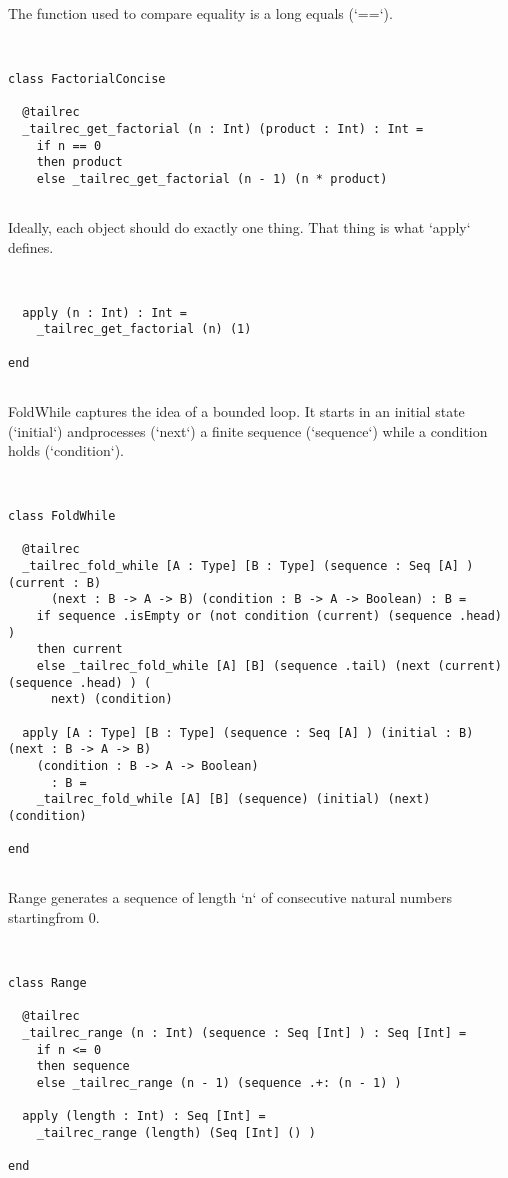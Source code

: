 \documentclass[12pt,a4paper]{article}
\begin{document}
The function used to compare equality is a long equals (`==`). 


\begin{lstlisting}


class FactorialConcise

  @tailrec
  _tailrec_get_factorial (n : Int) (product : Int) : Int =
    if n == 0
    then product
    else _tailrec_get_factorial (n - 1) (n * product)


\end{lstlisting}

Ideally, each object should do exactly one thing. That thing is what `apply` defines. 


\begin{lstlisting}


  apply (n : Int) : Int =
    _tailrec_get_factorial (n) (1)

end


\end{lstlisting}

FoldWhile captures the idea of a bounded loop. It starts in an initial state (`initial`) andprocesses (`next`) a finite sequence (`sequence`) while a condition holds (`condition`). 


\begin{lstlisting}


class FoldWhile

  @tailrec
  _tailrec_fold_while [A : Type] [B : Type] (sequence : Seq [A] ) (current : B)
      (next : B -> A -> B) (condition : B -> A -> Boolean) : B =
    if sequence .isEmpty or (not condition (current) (sequence .head) )
    then current
    else _tailrec_fold_while [A] [B] (sequence .tail) (next (current) (sequence .head) ) (
      next) (condition)

  apply [A : Type] [B : Type] (sequence : Seq [A] ) (initial : B) (next : B -> A -> B)
    (condition : B -> A -> Boolean)
      : B =
    _tailrec_fold_while [A] [B] (sequence) (initial) (next) (condition)

end


\end{lstlisting}

Range generates a sequence of length `n` of consecutive natural numbers startingfrom 0. 


\begin{lstlisting}


class Range

  @tailrec
  _tailrec_range (n : Int) (sequence : Seq [Int] ) : Seq [Int] =
    if n <= 0
    then sequence
    else _tailrec_range (n - 1) (sequence .+: (n - 1) )

  apply (length : Int) : Seq [Int] =
    _tailrec_range (length) (Seq [Int] () )

end


\end{lstlisting}
\end{document}
